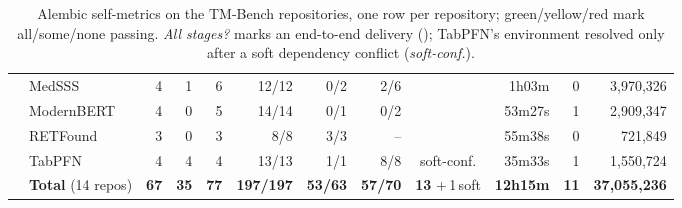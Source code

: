 \documentclass{article}
\newcommand{\G}[1]{\cellcolor{okgreen}#1}
\newcommand{\Y}[1]{\cellcolor{midyellow}#1}
\newcommand{\R}[1]{\cellcolor{badred}#1}
\newcommand{\cmark}{\ding{51}}
\begin{document}
\begin{table}
\begin{tabular}{@{}ll rrr rrr c rrr@{}}
 & MedSSS \small\citep{jiang2025medsss} & \Y{4} & \Y{1} & 6 & \G{12/12} & \R{0/2} & \Y{2/6} & \G{\cmark} & 1h03m & 0 & 3,970,326 \\
 & ModernBERT \small\citep{warner2024modernbert} & \Y{4} & \R{0} & 5 & \G{14/14} & \R{0/1} & \R{0/2} & \G{\cmark} & 53m27s & 1 & 2,909,347 \\
 & RETFound \small\citep{zhou2023retfound} & \G{3} & 0 & 3 & \G{8/8} & \G{3/3} & -- & \G{\cmark} & 55m38s & 0 & 721,849 \\
 & TabPFN \small\citep{hollmann2025tabpfn} & \G{4} & \G{4} & 4 & \G{13/13} & \G{1/1} & \G{8/8} & \Y{soft-conf.} & 35m33s & 1 & 1,550,724 \\
\midrule
 & \textbf{Total} (14 repos) & \textbf{67} & \textbf{35} & \textbf{77} & \textbf{197/197} & \textbf{53/63} & \textbf{57/70} & \textbf{13\,\cmark}\,+\,1\,soft & \textbf{12h15m} & \textbf{11} & \textbf{37,055,236} \\
\bottomrule
\end{tabular}
\caption{Alembic self-metrics on the TM-Bench repositories, one row per repository; green/yellow/red mark all/some/none passing. \emph{All stages?} marks an end-to-end delivery (\cmark); TabPFN's environment resolved only after a soft dependency conflict (\emph{soft-conf.}).}
\label{tab:alembic-selfmetrics}
\end{table}



\end{document}
